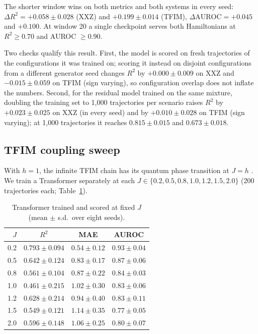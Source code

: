\documentclass[twocolumn,10pt]{article}
\begin{document}
The shorter window wins on both metrics and both systems in every seed:
$\Delta R^2 = +0.058 \pm 0.028$ (XXZ) and $+0.199 \pm 0.014$ (TFIM),
$\Delta\mathrm{AUROC} = +0.045$ and $+0.100$.
At window 20 a single checkpoint serves both Hamiltonians at
$R^2 \geq 0.70$ and AUROC $\geq 0.90$.

Two checks qualify this result.
First, the model is scored on fresh trajectories of the configurations
it was trained on; scoring it instead on disjoint configurations from a
different generator seed changes $R^2$ by $+0.000 \pm 0.009$ on XXZ and
$-0.015 \pm 0.059$ on TFIM (sign varying), so configuration overlap does not inflate
the numbers.
Second, for the residual model trained on the same mixture, doubling
the training set to 1{,}000 trajectories per scenario raises $R^2$ by
$+0.023 \pm 0.025$ on XXZ (in every seed) and by $+0.010 \pm 0.028$ on
TFIM (sign varying); at 1{,}000 trajectories it reaches
$0.815 \pm 0.015$ and $0.673 \pm 0.018$.

\subsection{TFIM coupling sweep}
\label{sec:e7c}

With $h = 1$, the infinite TFIM chain has its quantum phase transition
at $J = h$ \cite{Pfeuty1970,Sachdev2011}.
We train a Transformer separately at each
$J \in \{0.2, 0.5, 0.8, 1.0, 1.2, 1.5, 2.0\}$ (200 trajectories each;
Table~\ref{tab:r5}).

\begin{table}[h]
\centering
\caption{Transformer trained and scored at fixed $J$ (mean $\pm$ s.d.\
  over eight seeds).\label{tab:r5}}
\footnotesize
\setlength{\tabcolsep}{4pt}
\begin{tabular}{rccc}
\toprule
$J$ & $R^2$ & MAE & AUROC \\
\midrule
0.2 & $0.793 \pm 0.094$ & $0.54 \pm 0.12$ & $0.93 \pm 0.04$ \\
0.5 & $0.642 \pm 0.124$ & $0.83 \pm 0.17$ & $0.87 \pm 0.06$ \\
0.8 & $0.561 \pm 0.104$ & $0.87 \pm 0.22$ & $0.84 \pm 0.03$ \\
1.0 & $0.461 \pm 0.215$ & $1.02 \pm 0.30$ & $0.83 \pm 0.06$ \\
1.2 & $0.628 \pm 0.214$ & $0.94 \pm 0.40$ & $0.83 \pm 0.11$ \\
1.5 & $0.549 \pm 0.121$ & $1.14 \pm 0.35$ & $0.77 \pm 0.05$ \\
2.0 & $0.596 \pm 0.148$ & $1.06 \pm 0.25$ & $0.80 \pm 0.07$ \\
\bottomrule
\end{tabular}
\end{table}
\end{document}
